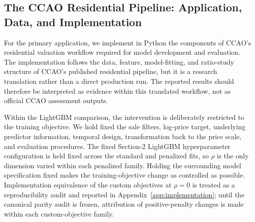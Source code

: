 \documentclass[10pt]{article}
\theoremstyle{definition}
\newcommand{\1}{\mathbf{1}}
\newcommand{\oldtext}[1]{\textcolor{blue}{\sout{#1}}}
\newcommand{\newtext}[1]{\textcolor{impGreen}{#1}}
\begin{document}
\subsection{{The CCAO Residential Pipeline: Application, Data, and Implementation}}
\label{subsec:ccao_design}


{For the primary application, we implement in Python the components of CCAO's residential valuation workflow required for model development and evaluation. The implementation follows the data, feature, model-fitting, and ratio-study structure of CCAO's published residential pipeline, but it is a research translation rather than a direct production run. The reported results should therefore be interpreted as evidence within this translated workflow, not as official CCAO assessment outputs.}


{Within the LightGBM comparison, the intervention is deliberately restricted to the training objective. We hold fixed the sale filters, log-price target, underlying predictor information, temporal design, transformation back to the price scale, and evaluation procedures. The 
\newtext{fixed Section-2 LightGBM hyperparameter configuration} is held fixed across the standard and penalized fits, so $\rho$ is the only dimension varied within each penalized family. 
\newtext{Holding the surrounding model specification fixed makes the training-objective change as controlled as possible. Implementation equivalence of the custom objectives at $\rho=0$ is treated as a reproducibility audit and reported in Appendix~\ref{app:implementation}; until the canonical parity audit is frozen, attribution of positive-penalty changes is made within each custom-objective family.}}
\end{document}
